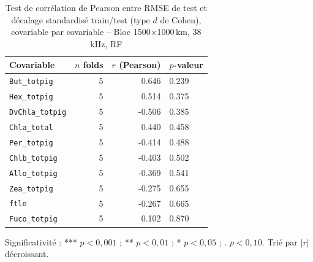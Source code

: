 \begin{table}[htbp]
\centering
\caption{Test de corr\'elation de Pearson entre RMSE de test et d\'ecalage standardis\'e train/test (type $d$ de Cohen), covariable par covariable -- Bloc 1500$\times$1000\,km, 38 kHz, RF}
\label{tab:covariate_distance_significance_blocked_spatial_1500x1000km}
\small
\begin{tabular}{lrrl}
\toprule
Covariable & $n$ folds & $r$ (Pearson) & $p$-valeur \\
\midrule
\texttt{But_totpig} & 5 & 0.646 & 0.239 \\
\texttt{Hex_totpig} & 5 & 0.514 & 0.375 \\
\texttt{DvChla_totpig} & 5 & -0.506 & 0.385 \\
\texttt{Chla_total} & 5 & 0.440 & 0.458 \\
\texttt{Per_totpig} & 5 & -0.414 & 0.488 \\
\texttt{Chlb_totpig} & 5 & -0.403 & 0.502 \\
\texttt{Allo_totpig} & 5 & -0.369 & 0.541 \\
\texttt{Zea_totpig} & 5 & -0.275 & 0.655 \\
\texttt{ftle} & 5 & -0.267 & 0.665 \\
\texttt{Fuco_totpig} & 5 & 0.102 & 0.870 \\
\bottomrule
\end{tabular}
\vspace{0.3em}
{\footnotesize Significativit\'e : *** $p<0{,}001$ ; ** $p<0{,}01$ ; * $p<0{,}05$ ; . $p<0{,}10$. Tri\'e par $|r|$ d\'ecroissant.}
\end{table}

